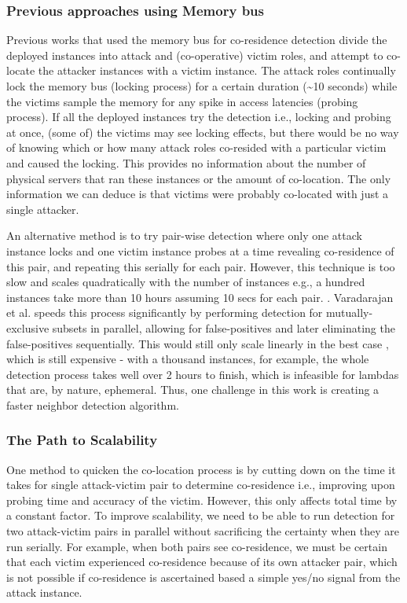 \subsubsection{Previous approaches using Memory bus}
Previous works that used the memory bus for co-residence detection divide the
deployed instances into attack and (co-operative) victim roles, and attempt to
co-locate the attacker instances with a victim instance. The attack roles
continually lock the memory bus (locking process) for a certain duration
(\textasciitilde 10 seconds) while the victims sample the memory for any spike
in access latencies (probing process). If all the deployed instances try the
detection i.e., locking and probing at once, (some of) the victims may see
locking effects, but there would be no way of knowing which or how many attack
roles co-resided with a particular victim and caused the locking. This provides
no information about the number of physical servers that ran these instances or
the amount of co-location. The only information we can deduce is that victims
were probably co-located with just a single attacker.

An alternative method is to try pair-wise detection where only one attack
instance locks and one victim instance probes at a time revealing co-residence
of this pair, and repeating this serially for each pair. However, this technique
is too slow and scales quadratically with the number of instances e.g., a
hundred instances take more than 10 hours assuming 10 secs for each pair.
. Varadarajan et al.\cite{varad191016} speeds
this process significantly by performing detection for mutually-exclusive
subsets in parallel, allowing for false-positives and later eliminating the
false-positives sequentially. This would still only scale linearly in the best
case , which is still expensive - with a thousand
instances, for example, the whole detection process takes well over 2 hours to
finish, which is infeasible for lambdas that are, by nature, ephemeral. Thus,
one challenge in this work is creating a faster neighbor detection algorithm.

\subsubsection{The Path to Scalability}

One method to quicken the co-location process is by cutting down on the time it
takes for single attack-victim pair to determine co-residence i.e., improving
upon probing time and accuracy of the victim. However, this only affects total
time by a constant factor. To improve scalability, we need to be able to run
detection for two attack-victim pairs in parallel without
sacrificing the certainty when they are run serially. For example, when both
pairs see co-residence, we must be certain that each victim experienced
co-residence because of its own attacker pair, which is not possible if
co-residence is ascertained based a simple yes/no signal from the attack
instance. 

